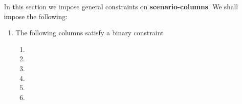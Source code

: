 \begin{center}
\end{center}
In this section we impose general constraints on \textbf{scenario-columns}. We shall impose the following:
\begin{enumerate}
	\item The following columns satisfy a binary constraint \lispDone{}
		\begin{enumerate}
			\item \scenReturnFromMessageCallWillTouchRam{}
			\item \scenReturnFromMessageCallWontTouchRam{}
			\item \scenReturnFromDeploymentEmptyByteCodeWillRevert{}
			\item \scenReturnFromDeploymentEmptyByteCodeWontRevert{}
			\item \scenReturnFromDeploymentNonemptyByteCodeWillRevert{}
			\item \scenReturnFromDeploymentNonemptyByteCodeWontRevert{}
		\end{enumerate}
\end{enumerate}
